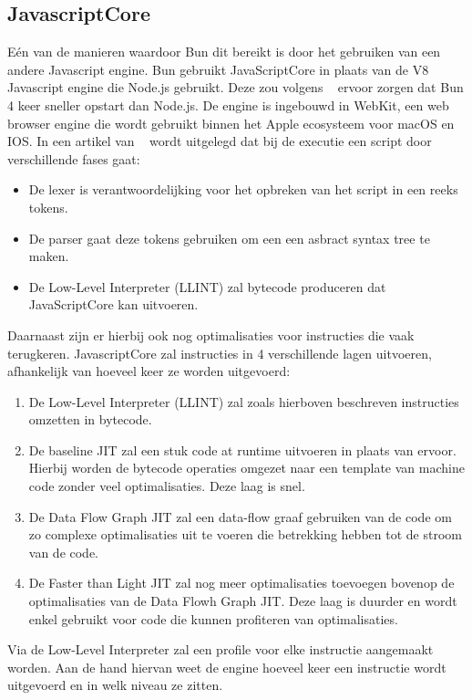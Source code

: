 \subsection{JavascriptCore}
Eén van de manieren waardoor Bun dit bereikt is door het gebruiken van een andere Javascript engine.
Bun gebruikt JavaScriptCore in plaats van de V8 Javascript engine die Node.js gebruikt. 
Deze zou volgens ~\textcite{McDonnel2023} ervoor zorgen dat Bun 4 keer sneller opstart dan Node.js. 
De engine is ingebouwd in WebKit, een web browser engine die wordt gebruikt binnen het Apple ecosysteem voor macOS en IOS.
In een artikel van ~\textcite{Pizlo2020} wordt uitgelegd dat bij de executie een script door verschillende fases gaat:
\begin{itemize}
    \item De lexer is verantwoordelijking voor het opbreken van het script in een reeks tokens.
    \item De parser gaat deze tokens gebruiken om een een asbract syntax tree te maken.
    \item De Low-Level Interpreter (LLINT) zal bytecode produceren dat JavaScriptCore kan uitvoeren.
\end{itemize}
Daarnaast zijn er hierbij ook nog optimalisaties voor instructies die vaak terugkeren. 
JavascriptCore zal instructies in 4 verschillende lagen uitvoeren, afhankelijk van hoeveel keer ze worden uitgevoerd:
\begin{enumerate}
    \item De Low-Level Interpreter (LLINT) zal zoals hierboven beschreven instructies omzetten in bytecode.
    \item De baseline JIT zal een stuk code at runtime uitvoeren in plaats van ervoor. 
    Hierbij worden de bytecode operaties omgezet naar een template van machine code zonder veel optimalisaties. Deze laag is snel.
    \item De Data Flow Graph JIT zal een data-flow graaf gebruiken van de code om zo complexe optimalisaties uit te voeren die betrekking hebben tot de stroom van de code.
    \item De Faster than Light JIT zal nog meer optimalisaties toevoegen bovenop de optimalisaties van de Data Flowh Graph JIT. 
    Deze laag is duurder en wordt enkel gebruikt voor code die kunnen profiteren van optimalisaties.
\end{enumerate}
Via de Low-Level Interpreter zal een profile voor elke instructie aangemaakt worden. 
Aan de hand hiervan weet de engine hoeveel keer een instructie wordt uitgevoerd en in welk niveau ze zitten.
